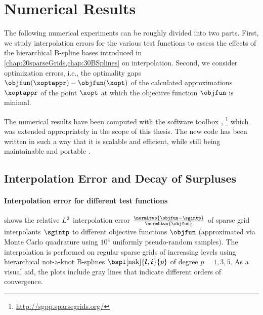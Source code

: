 \section{Numerical Results}
\label{sec:54results}


\noindent
The following numerical experiments can be roughly divided into two parts.
First, we study interpolation errors for the various test functions
to assess the effects of the hierarchical B-spline bases introduced in
\cref{chap:20sparseGrids,chap:30BSplines} on interpolation.
Second, we consider optimization errors, i.e.,
the optimality gaps $\objfun(\xoptappr) - \objfun(\xopt)$
of the calculated approximations $\xoptappr$
of the point $\xopt$ at which the objective function $\objfun$
is minimal.

The numerical results have been computed with the software toolbox \sgpp
\cite{Pflueger10Spatially},%
\footnote{%
  \url{http://sgpp.sparsegrids.org/}%
}
which was extended appropriately in the scope of this thesis.
The new code has been written in such a way that
it is scalable and efficient, while still being maintainable and
portable \cite{Pflueger16Scalability}.



\subsection{Interpolation Error and Decay of Surpluses}
\label{sec:541interpolation}

\paragraph{Interpolation error for different test functions}

 shows the
relative $L^2$ interpolation error
$\tfrac{\normLtwo{\objfun - \sgintp}}{\normLtwo{\objfun}}$
of sparse grid interpolants $\sgintp$ to
different objective functions $\objfun$
(approximated via Monte Carlo quadrature using
$10^4$ uniformly pseudo-random samples).
The interpolation is performed on regular sparse grids of increasing levels
using hierarchical not-a-knot B-splines $\bspl[\nak]{\*l,\*i}{p}$
of degree $p = 1, 3, 5$.
As a visual aid, the plots include gray lines that indicate different
orders of convergence.

